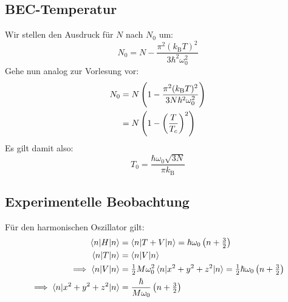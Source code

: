 \subsection{BEC-Temperatur}
Wir stellen den Ausdruck für $N$ nach $N_0$ um:
\[N_0 = N - \frac{\pi^2 (k_\text{B} T)^2}{3 \hbar^2 \omega_0^2} \]
Gehe nun analog zur Vorlesung vor:
\begin{align*}
N_0 &= N\del{1 - \frac{\pi^2 (k_\text{B} T)^2}{3N \hbar^2 \omega_0^2}} \\
&= N \del{1-\del{\frac{T}{T_c}}^2} \\
\end{align*}
Es gilt damit also:
\[T_0 = \frac{\hbar \omega_0 \sqrt{3N}}{\pi k_\text{B}} \]

\subsection{Experimentelle Beobachtung}
Für den harmonischen Oszillator gilt:
\begin{align*}
\braket{n|H|n} &= \braket{n|T+V|n} = \hbar \omega_0 \del {n+\tfrac{3}{2}} \\
\braket{n|T|n} &= \braket{n|V|n} \\
\implies \braket{n|V|n} &= \tfrac{1}{2} M \omega_0^2 \braket{n|x^2+y^2+z^2|n} =  \tfrac{1}{2} \hbar \omega_0 \del {n+\tfrac{3}{2}} \\
\implies \braket{n|x^2+y^2+z^2|n} &= \frac{\hbar}{M\omega_0} \del{n+\tfrac{3}{2}}
\end{align*}




